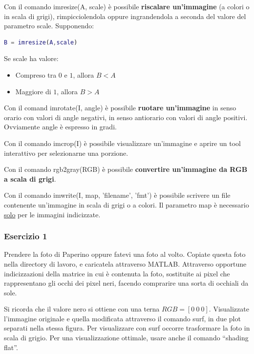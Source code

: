 \documentclass[a4paper]{article}
\newcommand{\dquotes}[1]{``#1''}
\begin{document}
	\noindent
	Con il comando \textsf{imresize(A, scale)} è possibile \textbf{riscalare un'immagine} (a colori o in scala di grigi), rimpicciolendola oppure ingrandendola a seconda del valore del parametro \textsf{scale}. Supponendo:
	\begin{lstlisting}[language=MATLAB]
B = imresize(A,scale)\end{lstlisting}
	Se \textsf{scale} ha valore:
	\begin{itemize}
		\item Compreso tra $0$ e $1$, allora $B < A$
		\item Maggiore di $1$, allora $B > A$
	\end{itemize}
	Con il comand \textsf{imrotate(I, angle)} è possibile \textbf{ruotare un'immagine} in senso orario con valori di \textsf{angle} negativi, in senso antiorario con valori di \textsf{angle} positivi. Ovviamente \textsf{angle} è espresso in gradi.\newline
	
	\noindent
	Con il comando \textsf{imcrop(I)} è possibile visualizzare un'immagine e aprire un tool interattivo per selezionarne una porzione.\newline
	
	\noindent
	Con il comando \textsf{rgb2gray(RGB)} è possibile \textbf{convertire un'immagine da RGB a scala di grigi}.\newline
	
	\noindent
	Con il comando \textsf{imwrite(I, map, 'filename', 'fmt')} è possibile scrivere un file contenente un'immagine in scala di grigi o a colori. Il parametro \textsf{map} è necessario \underline{solo} per le immagini indicizzate.\newpage
	
	\subsubsection{Esercizio 1}
	
	Prendere la foto di Paperino oppure fatevi una foto al volto. Copiate questa foto nella directory di lavoro, e caricatela attraverso MATLAB. Attraverso opportune indicizzazioni della matrice in cui è contenuta la foto, sostituite ai pixel che rappresentano gli occhi dei pixel neri, facendo comprarire una sorta di occhiali da sole.\newline
	
	\noindent
	Si ricorda che il valore nero si ottiene con una terna $RGB = \left[0 \: 0 \: 0\right]$. Visualizzate l'immagine originale e quella modificata attraverso il comando surf, in due plot separati nella stessa figura. Per visualizzare con surf occorre trasformare la foto in scala di grigio. Per una visualizzazione ottimale, usare anche il comando \dquotes{shading flat}.\newline
	
\end{document}
